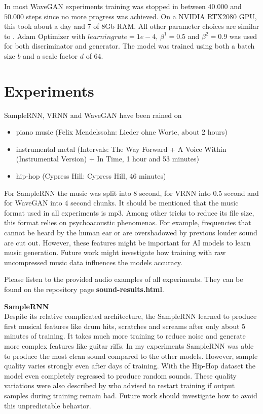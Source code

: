 \documentclass[12pt]{article}
\begin{document}
In most WaveGAN experiments training was stopped in between $40.000$ and $50.000$ steps since no more progress was achieved.
On a NVIDIA RTX2080 GPU, this took about a day and 7 of 8Gb RAM.
All other parameter choices are similar to \cite{donahue2018adversarial}.
Adam Optimizer with $learning rate = 1e-4$, $\beta^1 = 0.5$ and $\beta^2 = 0.9$ was used for both discriminator and generator.
The model was trained using both a batch size $b$ and a scale factor $d$ of $64$.








\section{Experiments}
SampleRNN, VRNN and WaveGAN have been rained on
\begin{itemize}
 \item piano music (Felix Mendelssohn: Lieder ohne Worte, about 2 hours)
 \item instrumental metal (Intervals: The Way Forward + A Voice Within (Instrumental Version) + In Time, 1 hour and 53 minutes) 
 \item hip-hop (Cypress Hill: Cypress Hill, 46 minutes)
\end{itemize}

For SampleRNN the music was split into 8 second, for VRNN into 0.5 second and for WaveGAN into 4 second chunks.
It should be mentioned that the music format used in all experiments is mp3.
Among other tricks to reduce its file size, this format relies on psychoacoustic phenomenas.
For example, frequencies that cannot be heard by the human ear or are overshadowed by previous louder sound are cut out.
However, these features might be important for AI models to learn music generation.
Future work might investigate how training with raw uncompressed music data influences the models accuracy.


Please listen to the provided audio examples of all experiments.
They can be found on the repository page \textbf{sound-results.html}.





\textbf{SampleRNN}\\
Despite its relative complicated architecture, the SampleRNN learned to produce first musical features like drum hits, scratches and screams after only about 5 minutes of training.
It takes much more training to reduce noise and generate more complex features like guitar riffs.
In my experiments SampleRNN was able to produce the most clean sound compared to the other models.
However, sample quality varies strongly even after days of training.
With the Hip-Hop dataset the model even completely regressed to produce random sounds.
These quality variations were also described by \cite{carr2018generating} who advised to restart training if output samples during training remain bad.
Future work should investigate how to avoid this unpredictable behavior.
\end{document}
